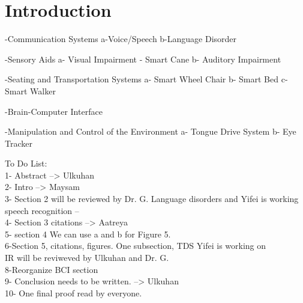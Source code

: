 \section{Introduction}




-Communication Systems
a-Voice/Speech
b-Language Disorder

-Sensory Aids
a- Visual Impairment - Smart Cane
b- Auditory Impairment

-Seating and Transportation Systems
a- Smart Wheel Chair
b- Smart Bed
c- Smart Walker

-Brain-Computer Interface

-Manipulation and Control of the Environment
a- Tongue Drive System
b- Eye Tracker

To Do List: \\
1- Abstract --> Ulkuhan\\
2- Intro --> Maysam\\
3- Section 2 will be reviewed by Dr. G. Language disorders and Yifei is working speech recognition -- \\
4- Section 3 citations --> Aatreya\\
5- section 4 We can use a and b for Figure 5.\\
6-Section 5, citations, figures. One subsection, TDS Yifei is working on\\
IR will be reviweved by Ulkuhan and Dr. G.\\
8-Reorganize BCI section\\
9- Conclusion needs to be written. --> Ulkuhan\\
10- One final proof read by everyone.\\